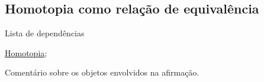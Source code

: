 \subsection{Homotopia como relação de equivalência} %
\label{homotopia-relaçao-de-equivalencia-prop}
\begin{titlemize}{Lista de dependências}
	\item \hyperref[homotopia-def]{Homotopia};\\ %
\end{titlemize}


Comentário sobre os objetos envolvidos na afirmação.


